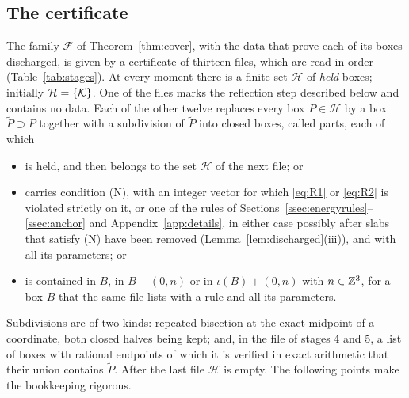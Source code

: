 \subsection{The certificate}\label{ssec:stages}

The family $\mathcal F$ of Theorem~\ref{thm:cover}, with the data that prove each of its boxes discharged, is given by a
certificate of thirteen files, which are read in order (Table~\ref{tab:stages}). At every moment there is a finite set
$\mathcal H$ of \emph{held} boxes; initially $\mathcal H=\{\mathcal K\}$. One of the files marks the reflection step described below
and contains no data. Each of the other twelve replaces every box $P\in\mathcal H$ by a box $\tilde P\supset P$ together with a
subdivision of $\tilde P$ into closed boxes, called parts, each of which
\begin{itemize}
\item[(a)] is held, and then belongs to the set $\mathcal H$ of the next file; or
\item[(b)] carries condition (N), with an integer vector for which \eqref{eq:R1} or \eqref{eq:R2} is violated strictly on it, or
one of the rules of Sections~\ref{ssec:energyrules}--\ref{ssec:anchor} and Appendix~\ref{app:details}, in either case possibly
after slabs that satisfy (N) have been removed (Lemma~\ref{lem:discharged}(iii)), and with all its parameters; or
\item[(c)] is contained in $B$, in $B+(0,n)$ or in $\iota(B)+(0,n)$ with $n\in\mathbb Z^3$, for a box $B$ that the same file lists
with a rule and all its parameters.
\end{itemize}
Subdivisions are of two kinds: repeated bisection at the exact midpoint of a coordinate, both closed halves being kept;
and, in the file of stages 4 and 5, a list of boxes with rational endpoints of which it is verified in exact arithmetic
that their union contains $\tilde P$. After the last file $\mathcal H$ is empty. The following points make the
bookkeeping rigorous.

